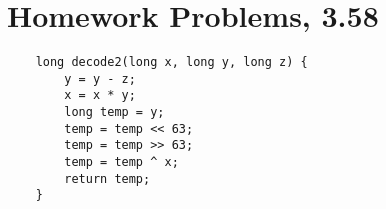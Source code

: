 \documentclass[11pt]{article}
\begin{document}
\section{Homework Problems, 3.58}
\begin{verbatim}
	long decode2(long x, long y, long z) {
	    y = y - z;
	    x = x * y;
	    long temp = y;
	    temp = temp << 63;
	    temp = temp >> 63;
	    temp = temp ^ x;
	    return temp;
	}

\end{verbatim}
   
\end{document}
